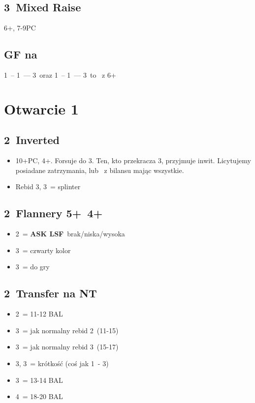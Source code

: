 \documentclass[12pt, a4paper]{article}
\newcommand{\lsf}{\color{WildStrawberry}\textbf{ASK LSF}\color{black}}
\begin{document}
\subsection*{3\clubs\ Mixed Raise}
6+\clubs, 7-9PC

\subsection*{GF na \clubs}
1\clubs\ -- 1\hearts\ --- 3\diams\ oraz 1\clubs\ -- 1\spades\ --- 3\diams\ to \gf\ z 6+\clubs


\pagebreak
\section{Otwarcie 1\diams}
\subsection{2\diams\ Inverted}
\begin{itemize}
    \item 10+PC, 4+\diams. Forsuje do 3\diams. Ten, kto przekracza 3\diams, przyjmuje inwit.
    Licytujemy posiadane zatrzymania, lub \nt\ z bilansu mając wszystkie.
    \item Rebid 3\hearts, 3\spades\ = splinter
\end{itemize}

\subsection*{2\hearts\ Flannery 5+\spades\ 4+\hearts}
\begin{itemize}
    \item 2\nt\ = \lsf\ brak/niska/wysoka
    \item 3\clubs\ = czwarty kolor \gf
    \item 3\diams\ = do gry
\end{itemize}

\subsection*{2\spades\ Transfer na NT}
\begin{itemize}
    \item 2\nt\ = 11-12 BAL
    \item 3\clubs\ = jak normalny rebid 2\diams\ (11-15)
    \item 3\diams\ = jak normalny rebid 3\diams\ (15-17)
    \item 3\hearts, 3\spades\ = krótkość (coś jak 1\nt\ - 3\hearts)
    \item 3\nt\ = 13-14 BAL
    \item 4\nt\ = 18-20 BAL
\end{itemize}
\end{document}
